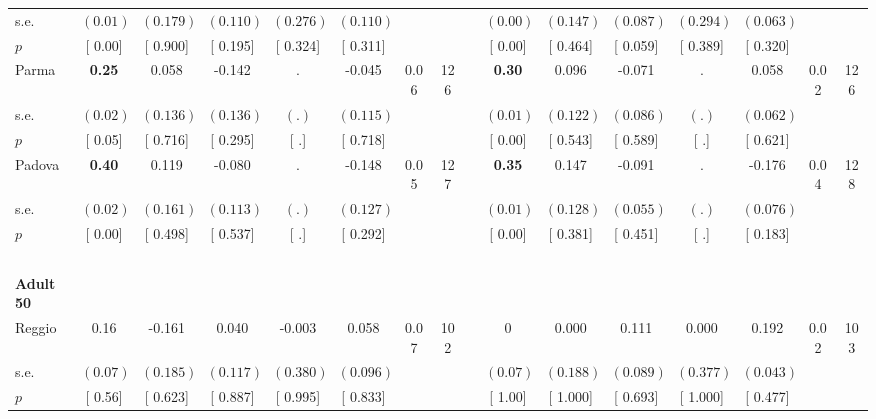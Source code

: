 \begin{longtable}{L{8em} c c c c c c c p{1em} c c c c c c c}
\quad \quad \quad \quad s.e.& $ (     0.01)$ & $ (    0.179)$ & $ (    0.110)$ & $ (    0.276)$ & $ (    0.110)$ & & & & $ (     0.00)$ & $ (    0.147)$ & $ (    0.087)$ & $ (    0.294)$ & $ (    0.063)$ & &  \\*
\quad \quad \quad \quad $ p$ & [     0.00] & [    0.900] & [    0.195] & [    0.324] & [    0.311] & & & & [     0.00] & [    0.464] & [    0.059] & [    0.389] & [    0.320] & &  \\[1em]
\quad \quad \quad Parma& \textbf{     0.25} &     0.058 &    -0.142 &         . &    -0.045 &      0.06 &       126 & & \textbf{     0.30} &     0.096 &    -0.071 &         . &     0.058 &      0.02 &       126  \\*
\quad \quad \quad \quad s.e.& $ (     0.02)$ & $ (    0.136)$ & $ (    0.136)$ & $ (        .)$ & $ (    0.115)$ & & & & $ (     0.01)$ & $ (    0.122)$ & $ (    0.086)$ & $ (        .)$ & $ (    0.062)$ & &  \\*
\quad \quad \quad \quad $ p$ & [     0.05] & [    0.716] & [    0.295] & [        .] & [    0.718] & & & & [     0.00] & [    0.543] & [    0.589] & [        .] & [    0.621] & &  \\[1em]
\quad \quad \quad Padova& \textbf{     0.40} &     0.119 &    -0.080 &         . &    -0.148 &      0.05 &       127 & & \textbf{     0.35} &     0.147 &    -0.091 &         . &    -0.176 &      0.04 &       128  \\*
\quad \quad \quad \quad s.e.& $ (     0.02)$ & $ (    0.161)$ & $ (    0.113)$ & $ (        .)$ & $ (    0.127)$ & & & & $ (     0.01)$ & $ (    0.128)$ & $ (    0.055)$ & $ (        .)$ & $ (    0.076)$ & &  \\*
\quad \quad \quad \quad $ p$ & [     0.00] & [    0.498] & [    0.537] & [        .] & [    0.292] & & & & [     0.00] & [    0.381] & [    0.451] & [        .] & [    0.183] & &  \\[1em]
~\\[1em]
\quad \quad \textbf{Adult 50} & & & & & & & & & & & & & & & \\* 
\quad \quad \quad Reggio& 0.16 &    -0.161 &     0.040 &    -0.003 &     0.058 &      0.07 &       102 & & 0 &     0.000 &     0.111 &     0.000 &     0.192 &      0.02 &       103  \\*
\quad \quad \quad \quad s.e.& $ (     0.07)$ & $ (    0.185)$ & $ (    0.117)$ & $ (    0.380)$ & $ (    0.096)$ & & & & $ (     0.07)$ & $ (    0.188)$ & $ (    0.089)$ & $ (    0.377)$ & $ (    0.043)$ & &  \\*
\quad \quad \quad \quad $ p$ & [     0.56] & [    0.623] & [    0.887] & [    0.995] & [    0.833] & & & & [     1.00] & [    1.000] & [    0.693] & [    1.000] & [    0.477] & &  \\[1em]

\end{longtable}
